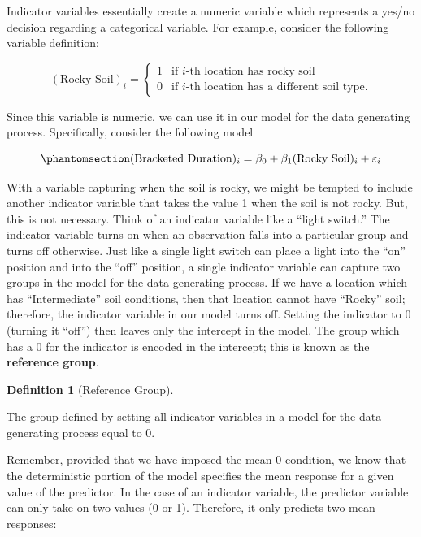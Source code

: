 \documentclass[
  letterpaper,
  DIV=11,
  numbers=noendperiod]{scrreprt}
\theoremstyle{definition}
\newtheorem{definition}{Definition}[chapter]
\theoremstyle{definition}
\theoremstyle{plain}
\theoremstyle{remark}
\begin{document}
Indicator variables essentially create a numeric variable which
represents a yes/no decision regarding a categorical variable. For
example, consider the following variable definition:

\[
(\text{Rocky Soil})_i = \begin{cases} 1 & \text{if } i\text{-th location has rocky soil} \\
0 & \text{if } i\text{-th location has a different soil type}. \end{cases}
\]

Since this variable is numeric, we can use it in our model for the data
generating process. Specifically, consider the following model

\begin{equation}\phantomsection\label{eq-regextensions-ind}{(\text{Bracketed Duration})_i = \beta_0 + \beta_1 (\text{Rocky Soil})_i + \varepsilon_i}\end{equation}

With a variable capturing when the soil is rocky, we might be tempted to
include another indicator variable that takes the value 1 when the soil
is not rocky. But, this is not necessary. Think of an indicator variable
like a ``light switch.'' The indicator variable turns on when an
observation falls into a particular group and turns off otherwise. Just
like a single light switch can place a light into the ``on'' position
and into the ``off'' position, a single indicator variable can capture
two groups in the model for the data generating process. If we have a
location which has ``Intermediate'' soil conditions, then that location
cannot have ``Rocky'' soil; therefore, the indicator variable in our
model turns off. Setting the indicator to 0 (turning it ``off'') then
leaves only the intercept in the model. The group which has a 0 for the
indicator is encoded in the intercept; this is known as the
\textbf{reference group}.

\begin{definition}[Reference
Group]\protect\hypertarget{def-reference-group}{}\label{def-reference-group}

The group defined by setting all indicator variables in a model for the
data generating process equal to 0.

\end{definition}

Remember, provided that we have imposed the mean-0 condition, we know
that the deterministic portion of the model specifies the mean response
for a given value of the predictor. In the case of an indicator
variable, the predictor variable can only take on two values (0 or 1).
Therefore, it only predicts two mean responses:
\end{document}
